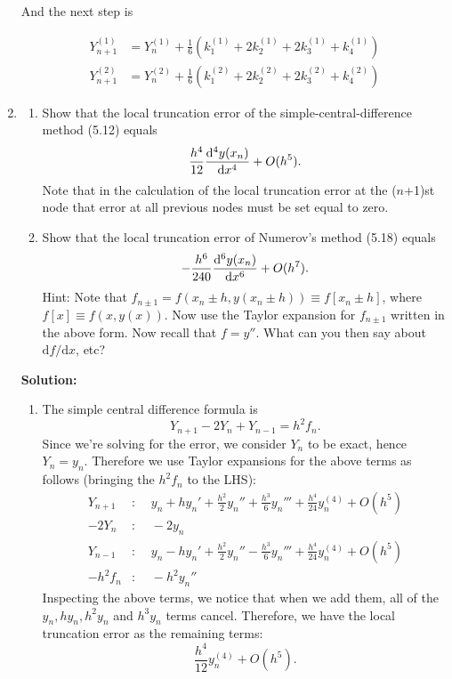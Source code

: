 \documentclass[11pt]{article}
\def\f{\frac }
\newcommand{\diffhi}[3]{\frac{{\rm d}^#3 #1}{{\rm d} {#2}^#3}}
\newcommand{\tdiff}[2]{\mbox{d} #1/\mbox{d} #2}
\newcommand{\oh}[1]{O(h^{{#1}})}
\begin{document}
\begin{enumerate}
And the next step is

\begin{align*} Y_{n+1}^{(1)} &= Y_n ^{(1)} + \f{1}{6} \left( k_1 ^{(1)} + 2k_2 ^{(1)} + 2k_3 ^{(1)} + k_4 ^{(1)} \right ) \\
Y_{n+1}^{(2)} &= Y_n ^{(2)} + \f{1}{6} \left( k_1 ^{(2)} + 2k_2 ^{(2)} + 2k_3 ^{(2)} + k_4 ^{(2)} \right ) \end{align*}

\clearpage
\pagebreak
\item 
\begin{enumerate}
\item Show that the local truncation error of the simple-central-difference method (5.12) equals
\[ \f{h^4}{12} \diffhi{y(x_n)}{x}{4} + O(h^5) .\]
Note that in the calculation of the local truncation error at the ($n$+1)st node that error at all previous nodes must be set equal to zero.

\item Show that the local truncation error of Numerov's method (5.18) equals
\[ -\f{h^6}{240} \diffhi{y(x_n)}{x}{6} + O(h^7) .\]
Hint: Note that $f_{n\pm 1} = f(x_n \pm h, y(x_n \pm h)) \equiv f[x_n \pm h ]$, where $f[x] \equiv f(x,y(x))$.
Now use the Taylor expansion for $f_{n\pm 1} $ written in the above form.
Now recall that $f = y''$.
What can you then say about $\tdiff{f}{x}$, etc?
\end{enumerate}

\bigskip
\textbf{Solution:}
\begin{enumerate}
\item The simple central difference formula is
\[ Y_{n+1} -2 Y_{n} + Y_{n-1} = h^2 f_n .\]
Since we're solving for the error, we consider $Y_n$ to be exact, hence $Y_n = y_n$.
Therefore we use Taylor expansions for the above terms as follows (bringing the $h^2f_n$ to the LHS):
\begin{align*} Y_{n+1} &:~~~~~ y_n + hy_n' + \f{h^2}{2} y_n'' + \f{h^3}{6} y_n ''' + \f{h^4}{24} y_n^{(4)} + \oh{5} \\
-2Y_{n} &:~~~~~ -2y_n\\
Y_{n-1} &:~~~~~ y_n - hy_n' + \f{h^2}{2} y_n'' - \f{h^3}{6} y_n ''' + \f{h^4}{24} y_n^{(4)} + \oh{5} \\
-h^2f_{n} &:~~~~~ -h^2y_n'' \end{align*}
Inspecting the above terms, we notice that when we add them, all of the $y_n, hy_n, h^2y_n$ and $h^3y_n$ terms cancel.
Therefore, we have the local truncation error as the remaining terms:
\[ \f{h^4}{12} y_n ^{(4)} + \oh{5} .\]


\end{enumerate}
\end{enumerate}
\end{document}

